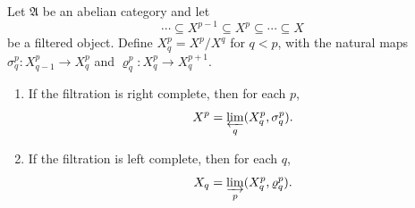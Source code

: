 Let $\mathfrak{A}$ be an abelian category and let
$$\cdots \subseteq X^{p-1} \subseteq X^p \subseteq \cdots \subseteq X$$
be a filtered object. Define $X_q^p = X^p / X^q$ for $q < p$, with the natural maps $\sigma_q^p : X_{q-1}^p \to X_q^p$ and $\varrho_q^p : X_q^p \to X_q^{p+1}$.

\begin{enumerate}
\item If the filtration is right complete, then for each $p$,
$$X^p = \varprojlim_q (X_q^p, \sigma_q^p).$$

\item If the filtration is left complete, then for each $q$,
$$X_q = \varinjlim_p (X_q^p, \varrho_q^p).$$
\end{enumerate}
